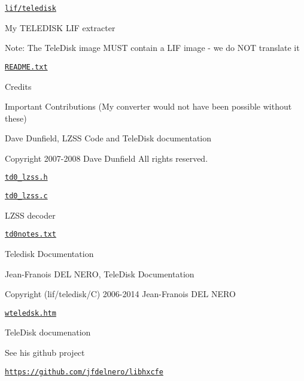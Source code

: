 \href{lif/teledisk}{\tt lif/teledisk}
\begin{DoxyItemize}
\item My T\+E\+L\+E\+D\+I\+SK L\+IF extracter
\begin{DoxyItemize}
\item Note\+: The Tele\+Disk image M\+U\+ST contain a L\+IF image -\/ we do N\+OT translate it
\end{DoxyItemize}
\item \href{lif/teledisk/README.txt}{\tt R\+E\+A\+D\+M\+E.\+txt}
\begin{DoxyItemize}
\item Credits
\end{DoxyItemize}
\item Important Contributions (My converter would not have been possible without these)
\begin{DoxyItemize}
\item Dave Dunfield, L\+Z\+SS Code and Tele\+Disk documentation
\begin{DoxyItemize}
\item Copyright 2007-\/2008 Dave Dunfield All rights reserved.
\item \href{lif/teledisk/td0_lzss.h}{\tt td0\+\_\+lzss.\+h}
\item \href{lif/teledisk/td0_lzss.c}{\tt td0\+\_\+lzss.\+c}
\begin{DoxyItemize}
\item L\+Z\+SS decoder
\end{DoxyItemize}
\item \href{lif/teledisk/td0notes.txt}{\tt td0notes.\+txt}
\begin{DoxyItemize}
\item Teledisk Documentation
\end{DoxyItemize}
\end{DoxyItemize}
\item Jean-\/\+Franois D\+EL N\+E\+RO, Tele\+Disk Documentation
\begin{DoxyItemize}
\item Copyright (lif/teledisk/C) 2006-\/2014 Jean-\/\+Franois D\+EL N\+E\+RO
\begin{DoxyItemize}
\item \href{lif/teledisk/wteledsk.htm}{\tt wteledsk.\+htm}
\begin{DoxyItemize}
\item Tele\+Disk documenation
\end{DoxyItemize}
\item See his github project
\begin{DoxyItemize}
\item \href{https://github.com/jfdelnero/libhxcfe}{\tt https\+://github.\+com/jfdelnero/libhxcfe}
\end{DoxyItemize}
\end{DoxyItemize}
\end{DoxyItemize}
\end{DoxyItemize}
\end{DoxyItemize}

